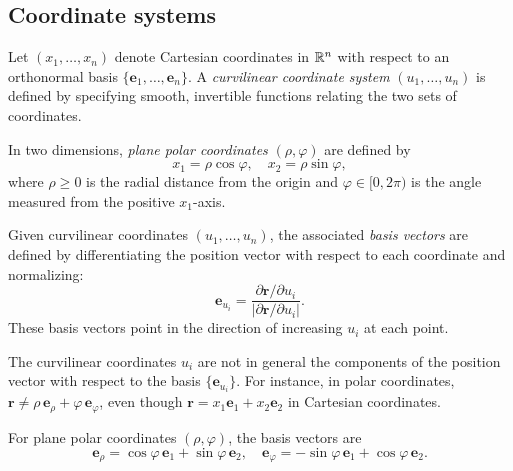 \documentclass[a4paper]{article}
\begin{document}
\subsection{Coordinate systems}

\begin{defi}
  Let $(x_1, \ldots, x_n)$ denote Cartesian coordinates in $\mathbb{R}^n$ with respect to an orthonormal basis $\{\mathbf{e}_1, \ldots, \mathbf{e}_n\}$. A \emph{curvilinear coordinate system} $(u_1, \ldots, u_n)$ is defined by specifying smooth, invertible functions relating the two sets of coordinates.
\end{defi}

\begin{eg}
  In two dimensions, \emph{plane polar coordinates} $(\rho, \varphi)$ are defined by
  \[
    x_1 = \rho\cos\varphi, \quad x_2 = \rho\sin \varphi,
  \]
  where $\rho \geq 0$ is the radial distance from the origin and $\varphi \in [0, 2\pi)$ is the angle measured from the positive $x_1$-axis.
\end{eg}

\begin{defi}
  Given curvilinear coordinates $(u_1, \ldots, u_n)$, the associated \emph{basis vectors} are defined by differentiating the position vector with respect to each coordinate and normalizing:
  \[
    \mathbf{e}_{u_i} = \frac{\partial \mathbf{r}/\partial u_i}{|\partial \mathbf{r}/\partial u_i|}.
  \]
  These basis vectors point in the direction of increasing $u_i$ at each point.
\end{defi}

\begin{rmk}
  The curvilinear coordinates $u_i$ are not in general the components of the position vector with respect to the basis $\{\mathbf{e}_{u_i}\}$. For instance, in polar coordinates, $\mathbf{r} \neq \rho\,\mathbf{e}_\rho + \varphi\,\mathbf{e}_\varphi$, even though $\mathbf{r} = x_1 \mathbf{e}_1 + x_2 \mathbf{e}_2$ in Cartesian coordinates.
\end{rmk}

\begin{eg}
  For plane polar coordinates $(\rho, \varphi)$, the basis vectors are
  \[
    \mathbf{e}_\rho = \cos \varphi\, \mathbf{e}_1 + \sin \varphi\, \mathbf{e}_2,\quad \mathbf{e}_\varphi = -\sin \varphi\, \mathbf{e}_1 + \cos \varphi\, \mathbf{e}_2.
  \]
  \begin{center}
  \end{center}
\end{eg}
\end{document}
